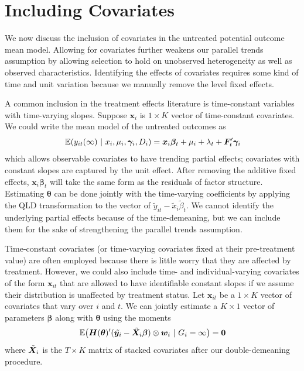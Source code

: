 \documentclass[12pt]{article}
\begin{document}
\section{Including Covariates}


We now discuss the inclusion of covariates in the untreated potential outcome mean model. Allowing for covariates further weakens our parallel trends assumption by allowing selection to hold on unobserved heterogeneity as well as observed characteristics. Identifying the effects of covariates requires some kind of time and unit variation because we manually remove the level fixed effects. 

A common inclusion in the treatment effects literature is time-constant variables with time-varying slopes. Suppose $\bm x_i$ is $1 \times K$ vector of time-constant covariates. We could write the mean model of the untreated outcomes as 
\begin{equation}
    \expec{y_{it}(\infty)}{x_i, \mu_i, \bm \gamma_i, D_i} = \bm x_i \bm \beta_t + \mu_i + \lambda_t + \bm{F}_t' \bm \gamma_i
\end{equation}
which allows observable covariates to have trending partial effects; covariates with constant slopes are captured by the unit effect. After removing the additive fixed effects, $\bm x_i \bm \beta_t$ will take the same form as the residuals of factor structure. Estimating $\bm{\theta}$ can be done jointly with the time-varying coefficients by applying the QLD transformation to the vector of $\tilde{y}_{it} - \tilde{x}_i \tilde{\beta}_t$. We cannot identify the underlying partial effects because of the time-demeaning, but we can include them for the sake of strengthening the parallel trends assumption.

Time-constant covariates (or time-varying covariates fixed at their pre-treatment value) are often employed because there is little worry that they are affected by treatment. However, we could also include time- and individual-varying covariates of the form $\bm x_{it}$ that are allowed to have identifiable constant slopes if we assume their distribution is unaffected by treatment status. Let $\bm x_{it}$ be a $1 \times K$ vector of covariates that vary over $i$ and $t$. We can jointly estimate a $K \times 1$ vector of parameters $\bm \beta$ along with $\bm{\theta}$ using the moments
\begin{equation}
    \expec{\bm H(\bm{\theta})' (\tilde{\bm y_i} - \tilde{\bm X_i} \bm \beta) \otimes \bm w_i}{G_i = \infty} = \bm 0
\end{equation}
where $\Tilde{\bm X}_i$ is the $T \times K$ matrix of stacked covariates after our double-demeaning procedure.
\end{document}
